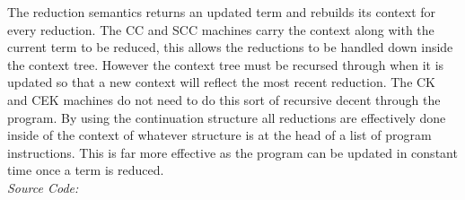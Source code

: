 \documentclass[10pt]{article}
\begin{document}
\noindent The reduction semantics returns an updated term and rebuilds its context for every reduction.  The CC and SCC machines carry the context along with the current term to be reduced, this allows the reductions to be handled down inside the context tree.  However the context tree must be recursed through when it is updated so that a new context will reflect the most recent reduction.  The CK and CEK machines do not need to do this sort of recursive decent through the program.  By using the continuation structure all reductions are effectively done inside of the context of whatever structure is at the head of a list of program instructions.  This is far more effective as the program can be updated in constant time once a term is reduced.\\
	
\textit{Source Code:}\\
	
\end{document}
